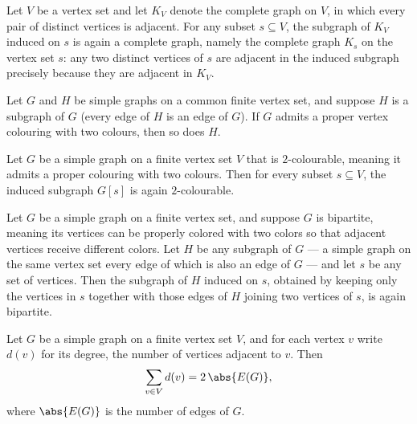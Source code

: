 \begin{theorem}
\label{SimpleGraph.induce_completeGraph}
\leanok
Let $V$ be a vertex set and let $K_V$ denote the complete graph on $V$, in which every
pair of distinct vertices is adjacent. For any subset $s \subseteq V$, the subgraph of
$K_V$ induced on $s$ is again a complete graph, namely the complete graph $K_s$ on the
vertex set $s$: any two distinct vertices of $s$ are adjacent in the induced subgraph
precisely because they are adjacent in $K_V$.
\end{theorem}

\begin{theorem}
\label{SimpleGraph.subgraph_bipartite}
\leanok
Let $G$ and $H$ be simple graphs on a common finite vertex set, and suppose $H$ is a
subgraph of $G$ (every edge of $H$ is an edge of $G$). If $G$ admits a proper vertex
colouring with two colours, then so does $H$.
\end{theorem}

\begin{theorem}
\label{SimpleGraph.induce_bipartite}
\leanok
Let $G$ be a simple graph on a finite vertex set $V$ that is $2$-colourable, meaning it
admits a proper colouring with two colours. Then for every subset $s \subseteq V$, the
induced subgraph $G[s]$ is again $2$-colourable.
\end{theorem}

\begin{theorem}
\label{SimpleGraph.subgraph_induce_bipartite}
\leanok
Let $G$ be a simple graph on a finite vertex set, and suppose $G$ is bipartite, meaning
its vertices can be properly colored with two colors so that adjacent vertices receive
different colors. Let $H$ be any subgraph of $G$ — a simple graph on the same vertex set
every edge of which is also an edge of $G$ — and let $s$ be any set of vertices. Then
the subgraph of $H$ induced on $s$, obtained by keeping only the vertices in $s$
together with those edges of $H$ joining two vertices of $s$, is again bipartite.
\end{theorem}

\begin{theorem}
\label{SimpleGraph.sum_degrees_eq_two_mul_edgeCard}
\leanok
Let $G$ be a simple graph on a finite vertex set $V$, and for each vertex $v$ write
$d(v)$ for its degree, the number of vertices adjacent to $v$. Then \[ \sum_{v \in V}
d(v) = 2\,\abs{E(G)}, \] where $\abs{E(G)}$ is the number of edges of $G$.
\end{theorem}

